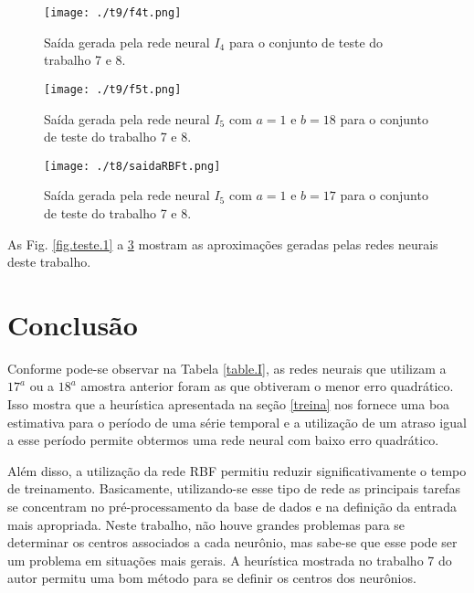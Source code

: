 \documentclass[10pt,journal,letterpaper,compsoc]{IEEEtran}
\begin{document}
\begin{figure}[!htb]
     \centering
     \texttt{[image: ./t9/f4t.png]}
     \caption{Saída gerada pela rede neural $I_4$ para o conjunto de teste do trabalho 7 e 8.}
     \label{fig.teste.4}
\end{figure}



\begin{figure}[!htb]
     \centering
     \texttt{[image: ./t9/f5t.png]}
     \caption{Saída gerada pela rede neural $I_5$ com $a=1$ e $b=18$ para o conjunto de teste do trabalho 7 e 8.}
     \label{fig.teste.5}
\end{figure}

\begin{figure}[!htb]
     \centering
     \texttt{[image: ./t8/saidaRBFt.png]}
     \caption{Saída gerada pela rede neural $I_5$ com $a=1$ e $b=17$ para o conjunto de teste do trabalho 7 e 8.}
     \label{fig.teste.6}
\end{figure}

As Fig. \ref{fig.teste.1} a \ref{fig.teste.6} mostram as aproximações geradas pelas redes neurais deste trabalho.

\section{Conclusão}
Conforme pode-se observar na Tabela \ref{table.I}, as redes neurais que utilizam a $17^a$ ou a
$18^a$ amostra anterior foram
as que obtiveram o menor erro quadrático. Isso mostra que a heurística apresentada na seção  \ref{treina}
nos fornece uma boa estimativa para o período de uma série temporal e a utilização de um atraso igual
a esse período permite obtermos uma rede neural com baixo erro quadrático.

Além disso, a utilização da rede RBF permitiu reduzir significativamente o tempo de treinamento. Basicamente,
utilizando-se esse tipo de rede as principais tarefas se concentram no pré-processamento da base de dados e
na definição da entrada mais apropriada. Neste trabalho, não houve grandes problemas para se determinar
os centros associados a cada neurônio, mas sabe-se que esse pode ser um problema em situações mais gerais.
A heurística mostrada no trabalho 7 do autor permitu uma bom método para se definir os centros dos neurônios.
\end{document}

